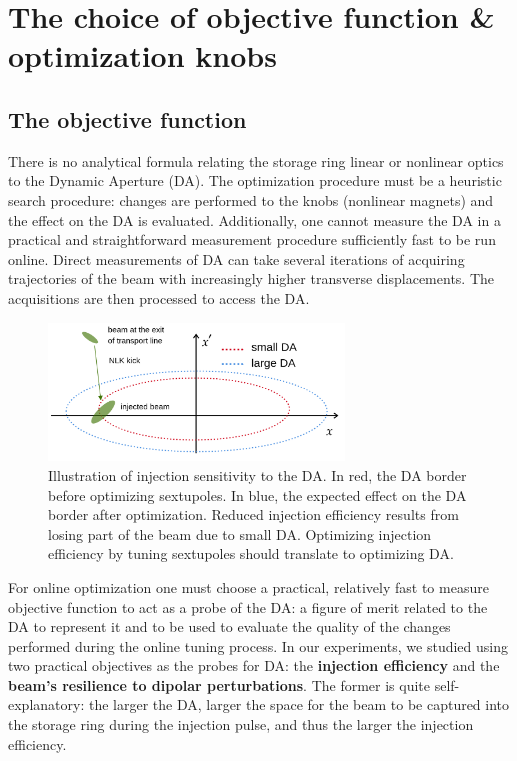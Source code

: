 \section{The choice of objective function \& optimization knobs}

\subsection{The objective function}
\label{subsec:objective_function}
There is no analytical formula relating the storage ring linear or nonlinear optics to the Dynamic Aperture (DA). The optimization procedure must be a heuristic search procedure: changes are performed to the knobs (nonlinear magnets) and the effect on the DA is evaluated. Additionally, one cannot measure the DA in a practical and straightforward measurement procedure sufficiently fast to be run online. Direct measurements of DA can take several iterations of acquiring trajectories of the beam with increasingly higher transverse displacements. The acquisitions are then processed to access the DA.

\begin{figure}
    \centering
    \includegraphics[width=0.7\textwidth]{Images/injection_illustration.png}
    \caption[Illustration of injection sensitivity to the DA]{Illustration of injection sensitivity to the DA. In red, the DA border before optimizing sextupoles. In blue, the expected effect on the DA border after optimization. Reduced injection efficiency results from losing part of the beam due to small DA. Optimizing injection efficiency by tuning sextupoles should translate to optimizing DA.}
    \label{fig:injection_efficiency}
\end{figure}

For online optimization one must choose a practical, relatively fast to measure objective function to act as a probe of the DA: a figure of merit related to the DA to represent it and to be used to evaluate the quality of the changes performed during the online tuning process. In our experiments, we studied using two practical objectives as the probes for DA: the \textbf{injection efficiency} and the \textbf{beam's resilience to dipolar perturbations}. The former is quite self-explanatory: the larger the DA, larger the space for the beam to be captured into the storage ring during the injection pulse, and thus the larger the injection efficiency.

